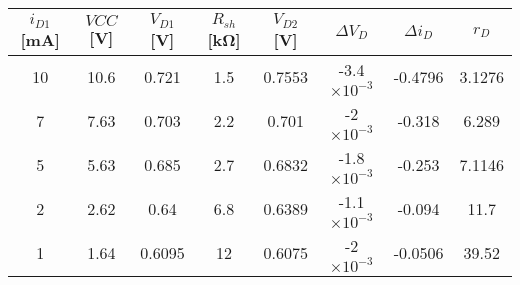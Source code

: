 

{}

\begin{table}[H]
    \centering
    \begin{tabular}{|c|c|c|c|c|c|c|c|}
    \hline
    \hline
        $i_{D1}$ [mA]  & $VCC$ [V] & $V_{D1}$ [V] & $R_{sh}$ [kΩ] & $V_{D2}$ [V] & $\Delta V_{D}$ & $\Delta i_{D}$ & $r_{D}$\\ \hline\hline
        10 & 10.6 & 0.721 & 1.5 & 0.7553 & -3.4$\times 10^{-3}$ & -0.4796 & 3.1276\\ 
        \hline
        7 & 7.63 & 0.703 & 2.2 & 0.701 & -2$\times 10^{-3}$ & -0.318 & 6.289\\ \hline
        5 & 5.63 & 0.685 & 2.7 & 0.6832 & -1.8$\times 10^{-3}$ & -0.253 & 7.1146\\ \hline
        2 & 2.62 & 0.64 & 6.8 & 0.6389 & -1.1$\times 10^{-3}$ & -0.094 & 11.7 \\ \hline
        1 & 1.64 & 0.6095 & 12 & 0.6075 & -2$\times 10^{-3}$ & -0.0506 & 39.52 \\ \hline\hline
    \end{tabular}
\end{table}






